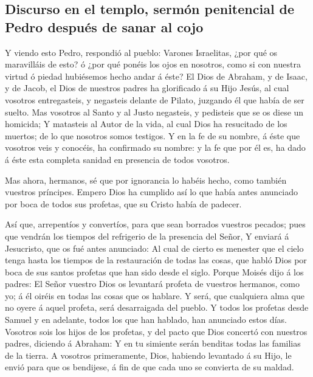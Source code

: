 \hypertarget{discurso-en-el-templo-sermuxf3n-penitencial-de-pedro-despuuxe9s-de-sanar-al-cojo}{%
\subsection{Discurso en el templo, sermón penitencial de Pedro después
de sanar al
cojo}\label{discurso-en-el-templo-sermuxf3n-penitencial-de-pedro-despuuxe9s-de-sanar-al-cojo}}

 Y viendo esto Pedro, respondió al pueblo: Varones
Israelitas, ¿por qué os maravilláis de esto? ó ¿por qué ponéis los ojos
en nosotros, como si con nuestra virtud ó piedad hubiésemos hecho andar
á éste?  El Dios de Abraham, y de Isaac, y de Jacob, el
Dios de nuestros padres ha glorificado á su Hijo Jesús, al cual vosotros
entregasteis, y negasteis delante de Pilato, juzgando él que había de
ser suelto.  Mas vosotros al Santo y al Justo negasteis,
y pedisteis que se os diese un homicida;  Y matasteis al
Autor de la vida, al cual Dios ha resucitado de los muertos; de lo que
nosotros somos testigos.  Y en la fe de su nombre, á éste
que vosotros veis y conocéis, ha confirmado su nombre: y la fe que por
él es, ha dado á éste esta completa sanidad en presencia de todos
vosotros.

 Mas ahora, hermanos, sé que por ignorancia lo habéis
hecho, como también vuestros príncipes.  Empero Dios ha
cumplido así lo que había antes anunciado por boca de todos sus
profetas, que su Cristo había de padecer.

 Así que, arrepentíos y convertíos, para que sean
borrados vuestros pecados; pues que vendrán los tiempos del refrigerio
de la presencia del Señor,  Y enviará á Jesucristo, que
os fué antes anunciado:  Al cual de cierto es menester
que el cielo tenga hasta los tiempos de la restauración de todas las
cosas, que habló Dios por boca de sus santos profetas que han sido desde
el siglo.  Porque Moisés dijo á los padres: El Señor
vuestro Dios os levantará profeta de vuestros hermanos, como yo; á él
oiréis en todas las cosas que os hablare.  Y será, que
cualquiera alma que no oyere á aquel profeta, será desarraigada del
pueblo.  Y todos los profetas desde Samuel y en adelante,
todos los que han hablado, han anunciado estos días. 
Vosotros sois los hijos de los profetas, y del pacto que Dios concertó
con nuestros padres, diciendo á Abraham: Y en tu simiente serán benditas
todas las familias de la tierra.  A vosotros
primeramente, Dios, habiendo levantado á su Hijo, le envió para que os
bendijese, á fin de que cada uno se convierta de su maldad.

